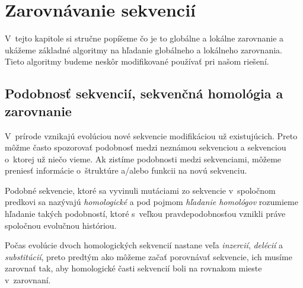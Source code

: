 \chapter{Zarovnávanie sekvencií}

V~tejto kapitole si stručne popíšeme čo je to globálne a lokálne zarovnanie a ukážeme základné algoritmy na hľadanie globálneho a lokálneho zarovnania. Tieto algoritmy budeme neskôr modifikované používať pri našom riešení.

\section{Podobnosť sekvencií, sekvenčná homológia a zarovnanie}
V~prírode vznikajú evolúciou nové sekvencie modifikáciou už existujúcich. Preto môžme často spozorovať podobnosť medzi neznámou sekvenciou a sekvenciou o~ktorej už niečo vieme. Ak zistíme podobnosti medzi sekvenciami, môžeme preniesť informácie o~štruktúre a/alebo funkcii na novú sekvenciu.

Podobné sekvencie, ktoré sa vyvinuli mutáciami zo sekvencie v~spoločnom predkovi sa nazývajú \textit{homologické} a pod pojmom \textit{hľadanie homológov} rozumieme hľadanie takých podobností, ktoré s~veľkou pravdepodobnosťou vznikli práve spoločnou evolučnou históriou.



Počas evolúcie dvoch homologických sekvencií nastane veľa \textit{inzercií}, \textit{delécií} a \textit{substitúcií}, preto predtým ako môžeme začať porovnávať sekvencie, ich musíme zarovnať tak, aby homologické časti sekvencií boli na rovnakom mieste v~zarovnaní.
\cite{durbin, skripta}

